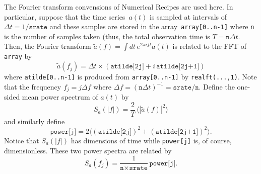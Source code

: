 The Fourier transform convensions of Numerical Recipes are used here.
In particular, suppose that the time series~$a(t)$ is sampled at intervals
of $\Delta t=1/\texttt{srate}$ and these samples are stored in the
array~\texttt{array[0..n-1]} where \texttt{n} is the number of samples taken
(thus, the total observation time is $T=\texttt{n}\Delta t$.  Then, the
Fourier transform $\tilde{a}(f)=\int dt\,e^{2\pi ift}a(t)$ is related to
the FFT of \texttt{array} by
\begin{equation}
  \tilde{a}(f_j) = \Delta t \times
    ( \texttt{atilde[2j]} + i\,\texttt{atilde[2j+1]} )
\end{equation}
where \texttt{atilde[0..n-1]} is produced from \texttt{array[0..n-1]} by
\texttt{realft(...,1)}.  Note that the frequency $f_j=j\Delta f$ where
$\Delta f=(\texttt{n}\Delta t)^{-1}=\texttt{srate}/\texttt{n}$.  Define the
one-sided mean power spectrum of $a(t)$ by
\begin{equation}
  S_a(|f|) = \frac{2}{T}\,\langle|\tilde{a}(f)|^2\rangle
\end{equation}
and similarly define
\begin{equation}
  \texttt{power[j]} = 2 \langle (\texttt{atilde[2j]})^2
    + (\texttt{atilde[2j+1]})^2 \rangle .
\end{equation}
Notice that $S_a(|f|)$ has dimensions of time while \texttt{power[j]} is,
of course, dimensionless.  These two power spectra are related by
\begin{equation}
  S_a(f_j) = \frac{1}{\texttt{n}\times\texttt{srate}}\,\texttt{power[j]}.
\end{equation}

